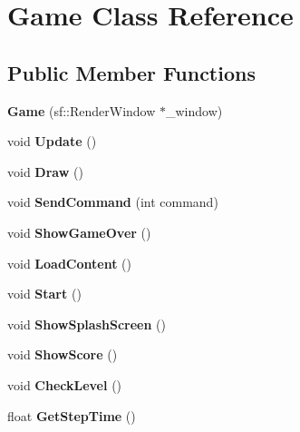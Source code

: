 \hypertarget{class_game}{}\section{Game Class Reference}
\label{class_game}
\subsection*{Public Member Functions}
\begin{DoxyCompactItemize}
\item 
\hypertarget{class_game_aeeb1733d0eca1ed03252e9b2f4aac3c2}{}{\bfseries Game} (sf\+::\+Render\+Window $\ast$\+\_\+window)\label{class_game_aeeb1733d0eca1ed03252e9b2f4aac3c2}

\item 
\hypertarget{class_game_a1c5373c68261c54aff03e6abe40fee52}{}void {\bfseries Update} ()\label{class_game_a1c5373c68261c54aff03e6abe40fee52}

\item 
\hypertarget{class_game_aad2c20e2c5529244095c50c238911e30}{}void {\bfseries Draw} ()\label{class_game_aad2c20e2c5529244095c50c238911e30}

\item 
\hypertarget{class_game_a847e210b774d7e835ba5bd2c42b3294a}{}void {\bfseries Send\+Command} (int command)\label{class_game_a847e210b774d7e835ba5bd2c42b3294a}

\item 
\hypertarget{class_game_a5c54000682c9ee01e8c3dc4e85c77c1a}{}void {\bfseries Show\+Game\+Over} ()\label{class_game_a5c54000682c9ee01e8c3dc4e85c77c1a}

\item 
\hypertarget{class_game_ac17881cb6091e10bae4e3b4c037ca854}{}void {\bfseries Load\+Content} ()\label{class_game_ac17881cb6091e10bae4e3b4c037ca854}

\item 
\hypertarget{class_game_adb05b20574551a26f8cf1dc664782790}{}void {\bfseries Start} ()\label{class_game_adb05b20574551a26f8cf1dc664782790}

\item 
\hypertarget{class_game_a971548b24e9917f356e31b9dc65b276f}{}void {\bfseries Show\+Splash\+Screen} ()\label{class_game_a971548b24e9917f356e31b9dc65b276f}

\item 
\hypertarget{class_game_aedfef6ad004634dc5368e97ecd3f5d43}{}void {\bfseries Show\+Score} ()\label{class_game_aedfef6ad004634dc5368e97ecd3f5d43}

\item 
\hypertarget{class_game_aec8e8164f26cca2671539eaf96477447}{}void {\bfseries Check\+Level} ()\label{class_game_aec8e8164f26cca2671539eaf96477447}

\item 
\hypertarget{class_game_a28c88c259d02de49e172e86fc4acf8cb}{}float {\bfseries Get\+Step\+Time} ()\label{class_game_a28c88c259d02de49e172e86fc4acf8cb}

\end{DoxyCompactItemize}
